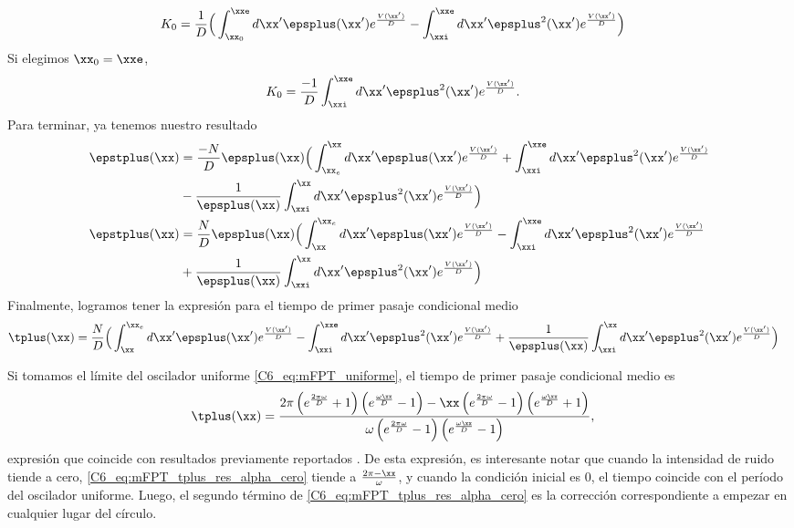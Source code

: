 {\begin{align}
   K_0 &= \frac{1}{D} \Big( \int_{\xx_0}^{\xxe} d \xx' \epsplus(\xx') e^{ \frac{V(\xx')}{D}} - \int_{\xxi}^{\xxe} d\xx'  \epsplus^2(\xx') e^{ \frac{V(\xx')}{D}}\Big)
\end{align}
Si elegimos $\xx_0 = \xxe$,
\begin{align}
   K_0 &= \frac{-1}{D} \int_{\xxi}^{\xxe} d\xx'  \epsplus^2(\xx') e^{ \frac{V(\xx')}{D}}.
\end{align}
Para terminar, ya tenemos nuestro resultado 
\begin{align}
   \epstplus(\xx) &= \frac{-N}{D} \epsplus(\xx) \Big(  \int_{\xx_e}^\xx d \xx' \epsplus(\xx') e^{ \frac{V(\xx')}{D}} +  \int_{\xxi}^{\xxe} d\xx'  \epsplus^2(\xx') e^{ \frac{V(\xx')}{D}} \nonumber \\ & - \frac{1}{\epsplus(\xx)} \int_{\xxi}^{\xx} d\xx'  \epsplus^2(\xx') e^{ \frac{V(\xx')}{D}} \Big)\\
     \epstplus(\xx) &= \frac{N}{D} \epsplus(\xx) \Big(  \int_\xx^{\xx_e} d \xx' \epsplus(\xx') e^{ \frac{V(\xx')}{D}} -  \int_{\xxi}^{\xxe} d\xx'  \epsplus^2(\xx') e^{ \frac{V(\xx')}{D}} \nonumber \\ & + \frac{1}{\epsplus(\xx)} \int_{\xxi}^{\xx} d\xx'  \epsplus^2(\xx') e^{ \frac{V(\xx')}{D}} \Big)
\end{align}
Finalmente, logramos tener la expresión para el tiempo de primer pasaje condicional medio
\begin{align}
     \tplus(\xx)&= \frac{N}{D} \Big(  \int_\xx^{\xx_e} d \xx' \epsplus(\xx') e^{ \frac{V(\xx')}{D}} -  \int_{\xxi}^{\xxe} d\xx'  \epsplus^2(\xx') e^{ \frac{V(\xx')}{D}} + \frac{1}{\epsplus(\xx)} \int_{\xxi}^{\xx} d\xx'  \epsplus^2(\xx') e^{ \frac{V(\xx')}{D}} \Big) \label{C6_eq:mFPT_tplus_res}
\end{align}

Si tomamos el límite del oscilador uniforme \ref{C6_eq:mFPT_uniforme}, el tiempo de primer pasaje condicional medio es 
\begin{align}
     \tplus(\xx)& = \frac{2 \pi \left(e^{\frac{2 \pi \omega}{D}}+1\right) \left(e^{\frac{\omega \xx}{D}}-1\right)-\xx\left(e^{\frac{2 \pi\omega}{D}}-1\right) \left(e^{\frac{\omega \xx}{D}}+1\right)}{\omega \left(e^{\frac{2 \pi \omega}{D}}-1\right) \left(e^{\frac{\omega \xx}{D}}-1\right)},
     \label{C6_eq:mFPT_tplus_res_alpha_cero} 
\end{align}
expresión que coincide con resultados previamente reportados \cite{Redner2001}. De esta expresión, es interesante notar que cuando la intensidad de ruido tiende a cero, \ref{C6_eq:mFPT_tplus_res_alpha_cero} tiende a $\frac{2\pi - \xx}{\omega}$, y cuando la condición inicial es $0$, el tiempo coincide con el período del oscilador uniforme. Luego, el segundo término de \ref{C6_eq:mFPT_tplus_res_alpha_cero} es la corrección correspondiente a empezar en cualquier lugar \xx del círculo. 


}
